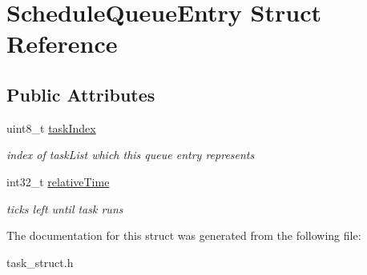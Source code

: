 \hypertarget{struct_schedule_queue_entry}{}\section{Schedule\+Queue\+Entry Struct Reference}
\label{struct_schedule_queue_entry}
\subsection*{Public Attributes}
\begin{DoxyCompactItemize}
\item 
\mbox{\label{struct_schedule_queue_entry_abc8b5276eba49000a51d199590e6e814}} 
uint8\+\_\+t \mbox{\hyperlink{struct_schedule_queue_entry_abc8b5276eba49000a51d199590e6e814}{task\+Index}}
\begin{DoxyCompactList}\small\item\em index of task\+List which this queue entry represents \end{DoxyCompactList}\item 
\mbox{\label{struct_schedule_queue_entry_a8a5cdca326daf422032ee37e8a6f916c}} 
int32\+\_\+t \mbox{\hyperlink{struct_schedule_queue_entry_a8a5cdca326daf422032ee37e8a6f916c}{relative\+Time}}
\begin{DoxyCompactList}\small\item\em ticks left until task runs \end{DoxyCompactList}\end{DoxyCompactItemize}


The documentation for this struct was generated from the following file\+:\begin{DoxyCompactItemize}
\item 
task\+\_\+struct.\+h\end{DoxyCompactItemize}

